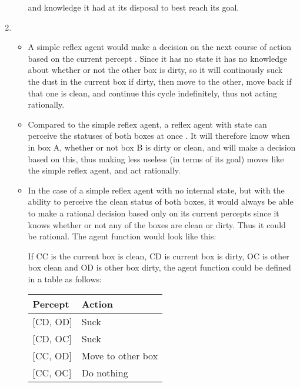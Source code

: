 \begin{enumerate}
\begin{itemize}
        and knowledge it had at its disposal to best reach its goal.
    \end{itemize}
  \item 
    \begin{itemize}
    \item 
        A simple reflex agent would make a decision on the next course of
        action based on the current percept 
        \autocite[p.~67]{russell2021artificial}. Since it has no state it has no
        knowledge about whether or not the other box is dirty, so it will
        continously suck the dust in the current box if dirty, then move to the 
        other, move back if that one is clean, and continue this cycle
        indefinitely, thus not acting rationally.
    \item 
        Compared to the simple reflex agent, a reflex agent with state can 
        perceive the statuses of both boxes at once 
        \autocite[p.~69]{russell2021artificial}. It will therefore know when 
        in box A, whether or not box B is dirty or clean, and will make a 
        decision based on this, thus making less useless (in terms of its goal) 
        moves like the simple reflex agent, and act rationally.
    \item 
        In the case of a simple reflex agent with no internal state, but with 
        the ability to perceive the clean status of both boxes, it would always
        be able to make a rational decision based only on its current percepts
        since it knows whether or not any of the boxes are clean or dirty. Thus
        it could be rational. The agent function would look like this:

        If CC is the current box is clean, CD is current box is dirty, OC is
        other box clean and OD is other box dirty, the agent function could
        be defined in a table as follows:

        \begin{table}[H]
        \centering
        \begin{tabular}{@{}ll@{}}
        \toprule
        Percept & Action \\ \midrule
        {[}CD, OD{]} & Suck \\
        {[}CD, OC{]} & Suck \\
        {[}CC, OD{]} & Move to other box \\
        {[}CC, OC{]} & Do nothing \\ \bottomrule
        \end{tabular}
        \end{table}


\end{itemize}
\end{enumerate}
